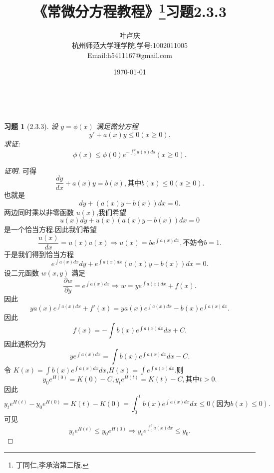 \documentclass[a4paper, 12pt]{article} %
\title{\textbf{《常微分方程教程》\footnote{丁同仁,李承治第二版.}习题2.3.3}}
\author{\small{叶卢庆}\\{\small{杭州师范大学理学院,学号:1002011005}}\\{\small{Email:h5411167@gmail.com}}} %
\date{\today} %
\makeatletter
\newtheorem*{cdtheorem}{习题}
\newenvironment{exercise}
{\bigskip\begin{mdframed}[backgroundcolor=gray!40,rightline=false,leftline=false,topline=false,bottomline=false]\begin{cdtheorem}}
    {\end{cdtheorem}\end{mdframed}\bigskip}
\renewcommand{\maketitle}{ %
  \renewcommand\refname{参考文献}
  \newcommand{\D}{\displaystyle}\newcommand{\ri}{\Rightarrow}
  \newcommand{\ds}{\displaystyle} \renewcommand{\ni}{\noindent}
  \newcommand{\pa}{\partial} \newcommand{\Om}{\Omega}
  \newcommand{\om}{\omega} \newcommand{\sik}{\sum_{i=1}^k}
  \newcommand{\vov}{\Vert\omega\Vert} \newcommand{\Umy}{U_{\mu_i,y^i}}
  \newcommand{\lamns}{\lambda_n^{^{\scriptstyle\sigma}}}
  \newcommand{\chiomn}{\chi_{_{\Omega_n}}}
  \newcommand{\ullim}{\underline{\lim}} \newcommand{\bsy}{\boldsymbol}
  \newcommand{\mvb}{\mathversion{bold}} \newcommand{\la}{\lambda}
  \newcommand{\La}{\Lambda} \newcommand{\va}{\varepsilon}
  \newcommand{\be}{\beta} \newcommand{\al}{\alpha}
  \newcommand{\dis}{\displaystyle} \newcommand{\R}{{\mathbb R}}
  \newcommand{\N}{{\mathbb N}} \newcommand{\cF}{{\mathcal F}}
  \newcommand{\gB}{{\mathfrak B}} \newcommand{\eps}{\epsilon}
  \begin{flushright} %
    {\LARGE\@title} %
    
    \vspace{50pt} %
    
    {\large\@author} %
    \\\@date %
    
    \vspace{40pt} %
  \end{flushright}
}
\makeatother
\begin{document}
\maketitle %







\begin{exercise}[2.3.3]
设 $y=\phi(x)$ 满足微分方程
$$
y'+a(x)y\leq 0(x\geq 0).
$$
求证:
$$
\phi(x)\leq \phi(0)e^{-\int _0^xa(s)ds}(x\geq 0).
$$
\end{exercise}
\begin{proof}[证明]
可得
$$
\frac{dy}{dx}+a(x)y=b(x),\mbox{其中}b(x)\leq 0(x\geq 0).
$$
也就是
$$
dy+(a(x)y-b(x))dx=0.
$$
两边同时乘以非零函数 $u(x)$,我们希望
$$
u(x)dy+u(x)(a(x)y-b(x))dx=0
$$
是一个恰当方程.因此我们希望
$$
\frac{u(x)}{dx}=u(x)a(x)\ri u(x)=be^{\int a(x)dx},\mbox{不妨令}b=1.
$$
于是我们得到恰当方程
$$
e^{\int a(x)dx}dy+e^{\int a(x)dx}(a(x)y-b(x))dx=0.
$$
设二元函数 $w(x,y)$ 满足
$$
\frac{\pa w}{\pa y}=e^{\int a(x)dx}\ri w=ye^{\int a(x)dx}+f(x).
$$
因此
$$
ya(x)e^{\int a(x)dx}+f'(x)=ya(x)e^{\int a(x)dx}-b(x)e^{\int a(x)dx}.
$$
因此
$$
f(x)=-\int b(x)e^{\int a(x)dx}dx+C.
$$
因此通积分为
$$
ye^{\int a(x)dx}=\int b(x)e^{\int a(x)dx}dx-C.
$$
令 $K(x)=\int b(x)e^{\int a(x)dx}dx$,$H(x)=\int e^{\int a(x)dx}$.则
$$
y_0e^{H(0)}=K(0)-C,y_te^{H(t)}=K(t)-C,\mbox{其中}t>0.
$$
因此
$$
y_te^{H(t)}-y_0e^{H(0)}=K(t)-K(0)=\int_0^tb(x)e^{\int a(x)dx}dx\leq
0(\mbox{因为}b(x)\leq 0).
$$
可见
$$
y_te^{H(t)}\leq y_0e^{H(0)}\ri y_te^{\int _0^ta(x)dx}\leq y_0.
$$

\end{proof}





\end{document}
